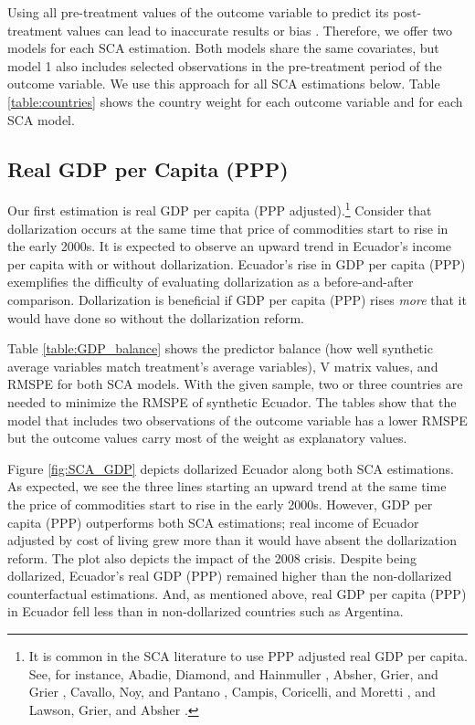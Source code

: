 \documentclass[12pt]{article}
\begin{document}


Using all pre-treatment values of the outcome variable to predict its post-treatment values can lead to inaccurate results or bias \parencite{Ashok2015}. Therefore, we offer two models for each SCA estimation. Both models share the same covariates, but model 1 also includes selected observations in the pre-treatment period of the outcome variable. We use this approach for all SCA estimations below. Table \ref{table:countries} shows the country weight for each outcome variable and for each SCA model.



\subsection{Real GDP per Capita (PPP)}

Our first estimation is real GDP per capita (PPP adjusted).\footnote{It is common in the SCA literature to use PPP adjusted real GDP per capita. See, for instance, Abadie, Diamond, and Hainmuller \parencite*{Abadie2015}, Absher, Grier, and Grier \parencite*{Absher2020}, Cavallo, Noy, and Pantano \parencite*{Cavallo2013}, Campis, Coricelli, and Moretti \parencite*{Campos2019}, and Lawson, Grier, and Absher \parencite*{Lawson2019}.} Consider that dollarization occurs at the same time that price of commodities start to rise in the early 2000s. It is expected to observe an upward trend in Ecuador's income per capita with or without dollarization. Ecuador's rise in GDP per capita (PPP) exemplifies the difficulty of evaluating dollarization as a before-and-after comparison. Dollarization is beneficial if GDP per capita (PPP) rises \textit{more} that it would have done so without the dollarization reform.  

Table \ref{table:GDP_balance} shows the predictor balance (how well synthetic average variables match treatment's average variables), V matrix values, and RMSPE for both SCA models. With the given sample, two or three countries are needed to minimize the RMSPE of synthetic Ecuador. The tables show that the model that includes two observations of the outcome variable has a lower RMSPE but the outcome values carry most of the weight as explanatory values.



Figure \ref{fig:SCA_GDP} depicts dollarized Ecuador along both SCA estimations. As expected, we see the three lines starting an upward trend at the same time the price of commodities start to rise in the early 2000s. However, GDP per capita (PPP) outperforms both SCA estimations; real income of Ecuador adjusted by cost of living grew more than it would have absent the dollarization reform. The plot also depicts the impact of the 2008 crisis. Despite being dollarized, Ecuador's real GDP (PPP) remained higher than the non-dollarized counterfactual estimations. And, as mentioned above, real GDP per capita (PPP) in Ecuador fell less than in non-dollarized countries such as Argentina.
\end{document}
